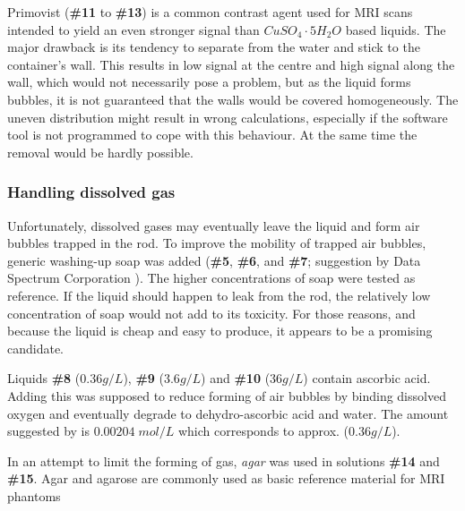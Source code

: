 \vspace{1cm}

Primovist (\textbf{\#11} to \textbf{\#13}) is a common contrast agent used for MRI scans \cite{VanBeers2012, Rohrer, primovist} intended to yield an even stronger signal than $CuSO_4\cdot5H_2O$ based liquids.
The major drawback is its tendency to separate from the water and stick to the container's wall.
This results in low signal at the centre and high signal along the wall, which would not necessarily pose a problem, but as the liquid forms bubbles, it is not guaranteed that the walls would be covered homogeneously.
The uneven distribution might result in wrong calculations, especially if the software tool is not programmed to cope with this behaviour.
At the same time the removal would be hardly possible.

\subsubsection{Handling dissolved gas}
Unfortunately, dissolved gases may eventually leave the liquid and form air bubbles trapped in the rod.
To improve the mobility of trapped air bubbles, generic washing-up soap was added (\textbf{\#5}, \textbf{\#6}, and \textbf{\#7}; suggestion by Data Spectrum Corporation \cite{bubbles}).
The higher concentrations of soap were tested as reference.
If the liquid should happen to leak from the rod, the relatively low concentration of soap would not add to its toxicity.
For those reasons, and because the liquid is cheap and easy to produce, it appears to be a promising candidate.

\vspace{1cm}

Liquids \textbf{\#8} ($0.36 g/L$), \textbf{\#9} ($3.6 g/L$) and \textbf{\#10} ($36 g/L$) contain ascorbic acid.
Adding this was supposed to reduce forming of air bubbles by binding dissolved oxygen and eventually degrade to dehydro-ascorbic acid and water.
The amount suggested by \cite{Abtahi2008, Bodannes1979} is $0.00204 \; mol/L$ which corresponds to approx. ($0.36 g/L$).

\vspace{1cm}

In an attempt to limit the forming of gas, \textit{agar} was used in solutions \textbf{\#14} and \textbf{\#15}.
Agar and agarose are commonly used as basic reference material for MRI phantoms \cite{BuccioliniCiraolo1989, Mathur-DeVre1985}

